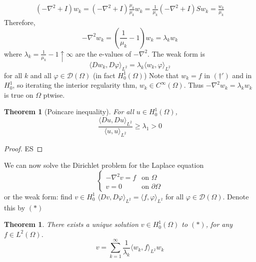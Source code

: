 \documentclass{article}
\theoremstyle{definition}
\theoremstyle{remark}
\theoremstyle{plain}
\newtheorem{thm}[defn]{Theorem}
\newcommand{\calD}{\mathcal{D}}
\begin{document}
\begin{align*}
    (-\nabla^2+I)w_k=(-\nabla^2+I)\frac{\mu_k}{\mu_k}w_k=\frac{1}{\mu_k}(-\nabla^2+I)Sw_k=\frac{w_k}{\mu_k}
\end{align*}
Therefore, \[-\nabla^2w_k=\left(\frac{1}{\mu_k}-1\right)w_k=\lambda_kw_k\]
where $\lambda_k=\frac{1}{\mu_k}-1\uparrow\infty$ are the e-values of $-\nabla^2$. The weak form is
\[\langle Dw_k,D\varphi\rangle_{L^2}=\lambda_k\langle w_k,\varphi\rangle_{L^2}\] for all $k$ and all $\varphi\in\calD(\Omega)$ (in fact $H_0^1(\Omega)$)
Note that $w_k=f$ in $(\dagger')$ and in $H_0^1$, so iterating the interior regularity thm, $w_k\in C^\infty(\Omega)$. Thus $-\nabla^2w_k=\lambda_kw_k$ is true on $\Omega$ ptwise.
\begin{thm}[Poincare inequality]
    For all $u\in H_0^1(\Omega)$, \[\frac{\langle Du,Du\rangle_{L^2}}{\langle u,u\rangle_{L^2}}\ge\lambda_1>0\]
\end{thm}
\begin{proof}
    ES
\end{proof}
We can now solve the Dirichlet problem for the Laplace equation
\[\begin{cases}
    -\nabla^2 v=f & \text{on }\Omega\\
    v=0 & \text{on }\partial\Omega
\end{cases}\]
or the weak form: find $v\in H_0^1$ $\langle Dv,D\varphi\rangle_{L^2}=\langle f,\varphi\rangle_{L^2}$ for all $\varphi\in\calD(\Omega)$. Denote this by $(\ast)$
\begin{thm}
    There exists a unique solution $v\in H_0^1(\Omega)$ to $(\ast)$, for any $f\in L^2(\Omega)$. 
    \[v=\sum_{k=1}^\infty\frac{1}{\lambda_k}\langle w_k,f\rangle_{L^2}w_k\]
\end{thm}
\end{document}
